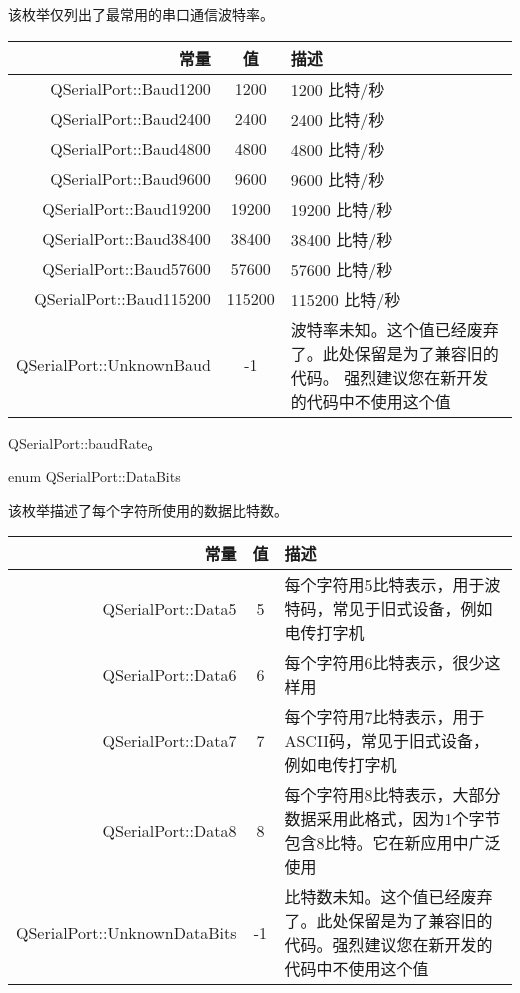 \begin{notice}
该枚举仅列出了最常用的串口通信波特率。
\end{notice}


\begin{longtable}{|r|c|m{20em}|}
\hline
常量	&值&	描述 \\ 
\hline
QSerialPort::Baud1200 &	1200&	1200 比特/秒 \\ 
\hline
QSerialPort::Baud2400	&2400&	2400 比特/秒 \\ 
\hline
QSerialPort::Baud4800	&4800&	4800 比特/秒 \\ 
\hline
QSerialPort::Baud9600	&9600&	9600 比特/秒 \\ 
\hline
QSerialPort::Baud19200	&19200&	19200 比特/秒 \\ 
\hline
QSerialPort::Baud38400	&38400	&38400 比特/秒 \\ 
\hline
QSerialPort::Baud57600	&57600	&57600 比特/秒 \\ 
\hline
QSerialPort::Baud115200&	115200&	115200 比特/秒 \\ 
\hline
QSerialPort::UnknownBaud	&-1	&波特率未知。这个值已经废弃了。此处保留是为了兼容旧的代码。
 强烈建议您在新开发的代码中不使用这个值 \\ 
\hline
\end{longtable}

\begin{seeAlso}
QSerialPort::baudRate。
\end{seeAlso}

enum QSerialPort::DataBits

该枚举描述了每个字符所使用的数据比特数。

\begin{longtable}{|r|c|m{20em}|}
\hline
常量	&值&	描述 \\ 
\hline 
QSerialPort::Data5 &	5&	每个字符用5比特表示，用于波特码，常见于旧式设备，例如电传打字机 \\ 
\hline
QSerialPort::Data6	&6&	每个字符用6比特表示，很少这样用 \\ 
\hline
QSerialPort::Data7&	7&	每个字符用7比特表示，用于ASCII码，常见于旧式设备，例如电传打字机 \\ 
\hline
QSerialPort::Data8	&8	&每个字符用8比特表示，大部分数据采用此格式，因为1个字节包含8比特。它在新应用中广泛使用 \\ 
\hline
QSerialPort::UnknownDataBits&	-1&	比特数未知。这个值已经废弃了。此处保留是为了兼容旧的代码。强烈建议您在新开发的代码中不使用这个值 \\ 
	\hline
\end{longtable}

